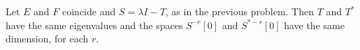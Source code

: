 Let $E$ and $F$ coincide and $S = \lambda I - T$, as in the previous problem. Then $T$ and $T^{*}$ have the same eigenvalues and the spaces $S^{-r}[0]$ and $S^{*-r}[0]$ have the same dimension, for each $r$.
